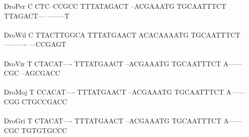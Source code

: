 \documentclass[11pt,twoside,reqno,a4paper]{article}
\begin{document}
{DroPer	C	CTC--CCGCC	TTTATAGACT	--ACGAAATG	TGCAATTTCT	TTAGACT---	--------T\\
\hspace*{7\charwidth}\hspace*{1\charwidth}\hspace*{1\charwidth}\hspace*{1\charwidth}\hspace*{1\charwidth}\hspace*{1\charwidth}\hspace*{1\charwidth}\\
DroWil	C	TTACTTGGCA	TTTATGAACT	ACACAAAATG	TGCAATTTCT	----------	---CCGAGT\\
\hspace*{7\charwidth}\hspace*{1\charwidth}\hspace*{1\charwidth}\hspace*{1\charwidth}\hspace*{1\charwidth}\hspace*{1\charwidth}\hspace*{1\charwidth}\\
DroVir	T	CTACAT----	TTTATGAACT	--ACGAAATG	TGCAATTTCT	A------CGC	--AGCGACC\\
\hspace*{7\charwidth}\hspace*{1\charwidth}\hspace*{1\charwidth}\hspace*{1\charwidth}\hspace*{1\charwidth}\hspace*{1\charwidth}\hspace*{1\charwidth}\\
DroMoj	T	CCACAT----	TTTATGAACT	--ACGAAATG	TGCAATTTCT	A------CGG	CTGCCGACC\\
\hspace*{7\charwidth}\hspace*{1\charwidth}\hspace*{1\charwidth}\hspace*{1\charwidth}\hspace*{1\charwidth}\hspace*{1\charwidth}\hspace*{1\charwidth}\\
DroGri	T	CTACAT----	TTTATGAACT	--ACGAAATG	TGCAATTTCT	A------CGC	TGTGTGCCC\\
\hspace*{7\charwidth}\hspace*{1\charwidth}\hspace*{1\charwidth}\hspace*{1\charwidth}\hspace*{1\charwidth}\hspace*{1\charwidth}\hspace*{1\charwidth}\\
}
\end{document}
